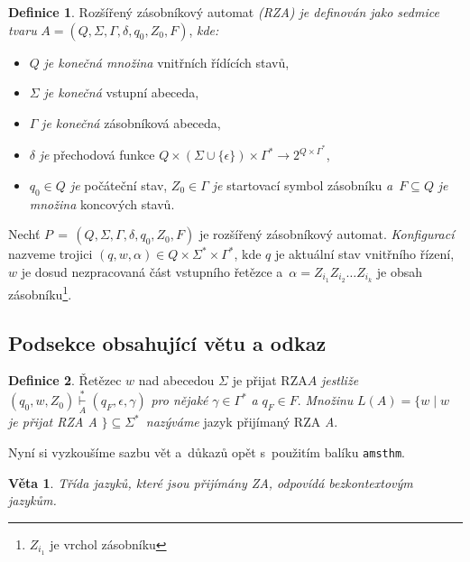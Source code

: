 \documentclass[twocolumn, a4paper, 11pt]{article}
\theoremstyle{definition}
\newtheorem{definition}{Definice}
\theoremstyle{plain}
\newtheorem{sentence}{Věta}
\begin{document}
\begin{definition}
    \label{definice_1}
    Rozšířený zásobníkový automat \emph{(RZA) je definován jako sedmice tvaru} $ A = (Q, \Sigma, \Gamma, \delta, q_0, Z_0, F) $,
    \emph{kde:}
    \renewcommand\labelitemi{$\hbox{\small$\bullet$}$} %
    \begin{itemize}
        \item $Q$ \emph{je konečná množina} vnitřních řídících stavů,
        \item $\Sigma$ \emph{je konečná} vstupní abeceda,
        \item $\Gamma$ \emph{je konečná} zásobníková abeceda,
        \item $\delta$ \emph{je} přechodová funkce
            $ Q \! \times \! ( \Sigma \! \cup \! \{ \epsilon \} ) \! \times \! {\Gamma}^* \rightarrow 2^{Q \times {\Gamma}^*} $,
        \item \emph{$ q_0 \in Q $ je} počáteční stav, \emph{$ Z_0 \in \Gamma $ je} startovací symbol zásobníku
            \emph{a}~$ F \subseteq Q $ \emph{je množina} koncových stavů.
    \end{itemize}
    
    Nechť $ P \, = \, ( Q, \Sigma, \Gamma, \delta, q_0, Z_0, F ) $ je rozšířený zásobníkový automat.
    \emph{Konfigurací} nazveme trojici $ ( q, w, \alpha ) \in Q \times {\Sigma}^* \times {\Gamma}^* $,
    kde $q$ je aktuální stav vnitřního řízení,\linebreak $w$ je dosud  nezpracovaná část vstupního řetězce
    a~$ \alpha = Z_{i_1} Z_{i_2} \dots Z_{i_k} $ je obsah zásobníku\footnote{$ Z_{i_1} $ je vrchol zásobníku}.
\end{definition}

\subsection{Podsekce obsahující větu a odkaz}
\begin{definition}
    \label{definice_2}
    Řetězec $w$ nad abecedou $\Sigma$ je přijat RZA\linebreak $A$ \emph{jestliže} $ ( q_0, w, Z_0 )
    \overset{*}{\underset{A}{\vdash}} ( q_F, \epsilon, \gamma ) $ \emph{pro nějaké} $ \gamma\!\in {\Gamma}^* $ \emph{a} $ q_F \in F $.
    \emph{Množinu} $ L(A) = \{ w \mid w $ \emph{je přijat RZA A} $ \} \subseteq {\Sigma}^* $~\emph{nazýváme} jazyk přijímaný RZA \emph{A}.
\end{definition}

Nyní si vyzkoušíme sazbu vět a~důkazů opět s~použitím balíku \verb|amsthm|.
\begin{sentence}
    \label{veta_1}
    Třída jazyků, které jsou přijímány ZA, odpovídá \textnormal{bezkontextovým jazykům.}
\end{sentence}
\end{document}
